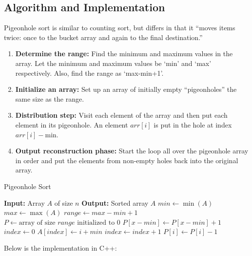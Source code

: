 \subsection{Algorithm and Implementation}

Pigeonhole sort is similar to counting sort, but differs in that it “moves items twice: once to the bucket array and again to the final destination.”

\begin{enumerate}
    \item \textbf{Determine the range:} Find the minimum and maximum values in the array. Let the minimum and maximum values be ‘min’ and ‘max’ respectively. Also, find the range as ‘max-min+1’.
    \item \textbf{Initialize an array:} Set up an array of initially empty “pigeonholes” the same size as the range.
    \item \textbf{Distribution step:} Visit each element of the array and then put each element in its pigeonhole. An element $arr[i]$ is put in the hole at index $arr[i] - \text{min}$.
    \item \textbf{Output reconstruction phase:} Start the loop all over the pigeonhole array in order and put the elements from non-empty holes back into the original array.
\end{enumerate}

\begin{algorithm}
    \caption{Pigeonhole Sort}
    \begin{algorithmic}[1]
        \State \textbf{Input:} Array $A$ of size $n$
        \State \textbf{Output:} Sorted array $A$
        \State $min \gets \min(A)$
        \State $max \gets \max(A)$
        \State $range \gets max - min + 1$
        \State $P \gets \text{array of size } range \text{ initialized to 0}$
            \State $P[x - min] \gets P[x - min] + 1$
        \EndFor
        \State $index \gets 0$
                \State $A[index] \gets i + min$
                \State $index \gets index + 1$
                \State $P[i] \gets P[i] - 1$
            \EndWhile
        \EndFor
        \EndFunction
    \end{algorithmic}
\end{algorithm}

\begin{minipage}{\linewidth}
    Below is the implementation in C++:
    
\end{minipage}

